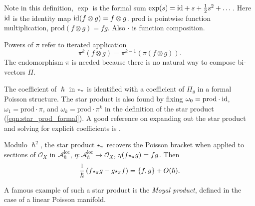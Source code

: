     
    
    
    \begin{rem}
    Note in this definition, \( \exp \) is the formal sum \( \exp(s) = \mathrm{id} + s + \frac{1}{2} s^2 + \dots\). Here \(  \mathrm{id} \) is the identity map \( \mathrm{id} (f \otimes g) = f \otimes g\). \( \mathrm{prod}\) is pointwise function multiplication, \( \mathrm{prod}(f \otimes g ) = f g\). Also \( \cdot\) is function composition. 
    
    Powers of \( \pi \) refer to iterated application \[ \pi^k ( f \otimes g ) = \pi^{k-1} ( \pi(f \otimes g ) ). \]  
    The endomorphism \( \pi \) is needed because there is no natural way to compose bi-vectors \( \Pi\).
    \end{rem} 

    
    The coefficient of \( \hslash\) in \( \starp_{\pi}\) is identified with a coefficient of \( \Pi_g\) in a formal Poisson structure. The star product is also found by fixing \( \omega_0 = \mathrm{prod} \cdot 
    \mathrm{id} \), \( \omega_1 = \mathrm{prod} \cdot \pi\), and  \( \omega_k = \mathrm{prod} \cdot \pi^k \) in the definition of the star product (\ref{eqn:star_prod_formal}). A good reference on expanding out the star product and solving for explicit coefficients is \cite{starprodeasy}.
    
    Modulo \(\hslash^2\), the star product \( \starp_{\pi}\) recovers the Poisson bracket when applied to sections of \( \mathcal{O}_X\) in \( \mathcal{A}^{\text{loc}}_{\hslash}\),  \( \eta : \mathcal{A}^{\text{loc}}_\hslash \rightarrow \mathcal{O}_X\),
    \( \eta ( f \starp_{\pi} g )= f g \). Then
    \begin{align}
        \label{eqn:star_to_pois}
        \frac{1}{\hslash } \left( f \starp_{\pi} g - g \starp_{\pi} f \right) = \{f,g\} + O(\hslash).
    \end{align}    
    \iffalse
    
    \fi 
    A famous example of such a star product is the \emph{Moyal product}, defined in the case of a linear Poisson manifold.
    

